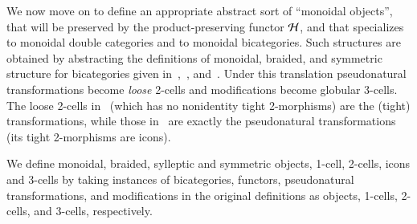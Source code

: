 We now move on to define an appropriate abstract sort of ``monoidal objects'', that will be preserved by the product-preserving functor $\mathcal{H}$, and that specializes to monoidal double categories and to monoidal bicategories. 
Such structures are obtained by abstracting the definitions of monoidal, braided, and symmetric structure for bicategories given in~\cite{nick:tricatsbook},~\cite{mccrudden:bal-coalgb}, and~\cite{gg:ldstr-tricat}. 
Under this translation pseudonatural transformations become \emph{loose} 2-cells and modifications become globular 3-cells.
The loose 2-cells in \fDblf\ (which has no nonidentity tight 2-morphisms) are the (tight) transformations, while those in \fBicat\ are exactly the pseudonatural transformations (its tight 2-morphisms are icons).

We define monoidal, braided, sylleptic and symmetric objects, 1-cell, 2-cells, icons and 3-cells by taking instances of bicategories, functors, pseudonatural transformations, and modifications in the original definitions as objects, 1-cells, 2-cells, and 3-cells, respectively. 

